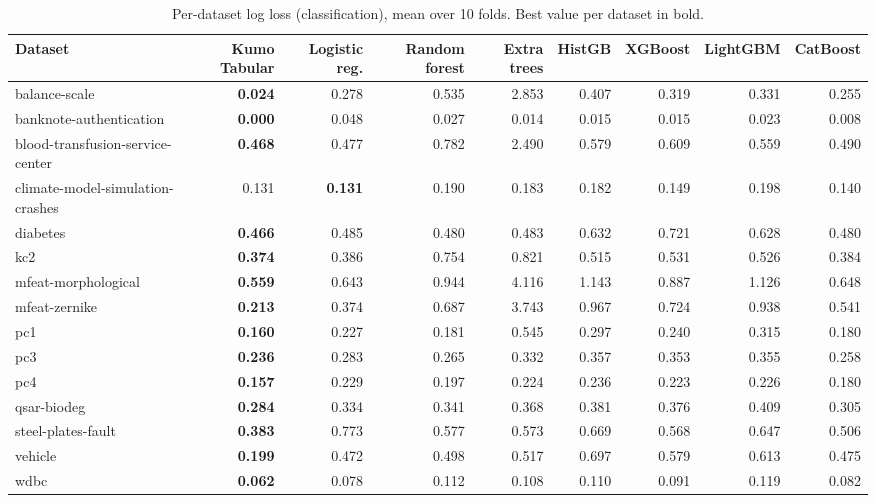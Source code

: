 \begin{table}[h]
\centering
\scriptsize
\setlength{\tabcolsep}{3pt}
\caption{Per-dataset log loss (classification), mean over 10 folds. Best value per dataset in bold.}
\label{tab:perdataset_classification}
\smallskip
\begin{adjustbox}{max width=\textwidth}
\begin{tabular}{lrrrrrrrr}
\toprule
Dataset & Kumo Tabular & Logistic reg. & Random forest & Extra trees & HistGB & XGBoost & LightGBM & CatBoost \\
\midrule
balance-scale & \textbf{0.024} & 0.278 & 0.535 & 2.853 & 0.407 & 0.319 & 0.331 & 0.255 \\
banknote-authentication & \textbf{0.000} & 0.048 & 0.027 & 0.014 & 0.015 & 0.015 & 0.023 & 0.008 \\
blood-transfusion-service-center & \textbf{0.468} & 0.477 & 0.782 & 2.490 & 0.579 & 0.609 & 0.559 & 0.490 \\
climate-model-simulation-crashes & 0.131 & \textbf{0.131} & 0.190 & 0.183 & 0.182 & 0.149 & 0.198 & 0.140 \\
diabetes & \textbf{0.466} & 0.485 & 0.480 & 0.483 & 0.632 & 0.721 & 0.628 & 0.480 \\
kc2 & \textbf{0.374} & 0.386 & 0.754 & 0.821 & 0.515 & 0.531 & 0.526 & 0.384 \\
mfeat-morphological & \textbf{0.559} & 0.643 & 0.944 & 4.116 & 1.143 & 0.887 & 1.126 & 0.648 \\
mfeat-zernike & \textbf{0.213} & 0.374 & 0.687 & 3.743 & 0.967 & 0.724 & 0.938 & 0.541 \\
pc1 & \textbf{0.160} & 0.227 & 0.181 & 0.545 & 0.297 & 0.240 & 0.315 & 0.180 \\
pc3 & \textbf{0.236} & 0.283 & 0.265 & 0.332 & 0.357 & 0.353 & 0.355 & 0.258 \\
pc4 & \textbf{0.157} & 0.229 & 0.197 & 0.224 & 0.236 & 0.223 & 0.226 & 0.180 \\
qsar-biodeg & \textbf{0.284} & 0.334 & 0.341 & 0.368 & 0.381 & 0.376 & 0.409 & 0.305 \\
steel-plates-fault & \textbf{0.383} & 0.773 & 0.577 & 0.573 & 0.669 & 0.568 & 0.647 & 0.506 \\
vehicle & \textbf{0.199} & 0.472 & 0.498 & 0.517 & 0.697 & 0.579 & 0.613 & 0.475 \\
wdbc & \textbf{0.062} & 0.078 & 0.112 & 0.108 & 0.110 & 0.091 & 0.119 & 0.082 \\
\bottomrule
\end{tabular}
\end{adjustbox}
\end{table}
